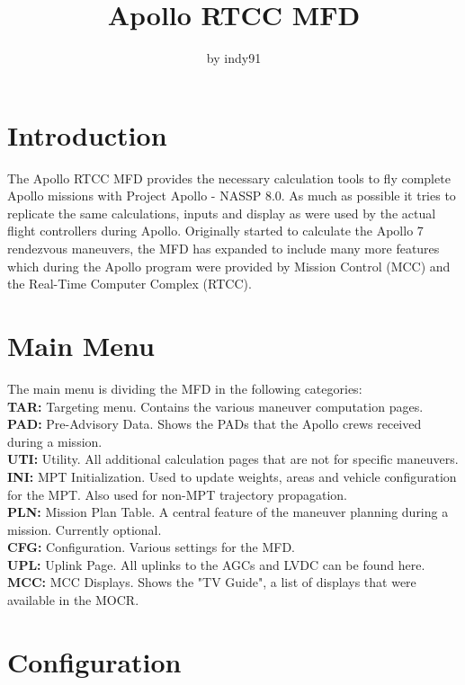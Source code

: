 \documentclass[11pt]{article} %
\title{Apollo RTCC MFD}
\author{by indy91}
\begin{document}
\maketitle

\section{Introduction}

The Apollo RTCC MFD provides the necessary calculation tools to fly complete Apollo missions with Project Apollo - NASSP 8.0. As much as possible it tries to replicate the same calculations, inputs and display as were used by the actual flight controllers during Apollo. Originally started to calculate the Apollo 7 rendezvous maneuvers, the MFD has expanded to include many more features which during the Apollo program were provided by Mission Control (MCC) and the Real-Time Computer Complex (RTCC).\\

\newpage
\tableofcontents
\newpage

\section{Main Menu}

The main menu is dividing the MFD in the following categories:\\
\textbf{TAR:} Targeting menu. Contains the various maneuver computation pages. \\
\textbf{PAD:} Pre-Advisory Data. Shows the PADs that the Apollo crews received during a mission.\\
\textbf{UTI:} Utility. All additional calculation pages that are not for specific maneuvers.\\
\textbf{INI:} MPT Initialization. Used to update weights, areas and vehicle configuration for the MPT. Also used for non-MPT trajectory propagation.\\ 
\textbf{PLN:} Mission Plan Table. A central feature of the maneuver planning during a mission. Currently optional.\\
\textbf{CFG:} Configuration. Various settings for the MFD.\\
\textbf{UPL:} Uplink Page. All uplinks to the AGCs and LVDC can be found here.\\
\textbf{MCC:} MCC Displays. Shows the "TV Guide", a list of displays that were available in the MOCR.\\
\newpage
\section{Configuration}
\end{document}
